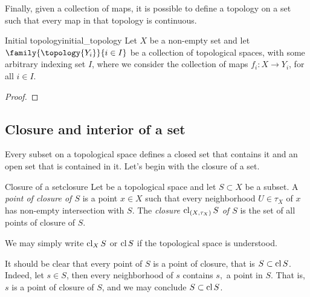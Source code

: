 Finally, given a collection of maps, it is possible to define a topology on a set such that every map in that topology is continuous.
\begin{proposition}{Initial topology}{initial_topology}
    Let \(X\) be a non-empty set and let \(\family{\topology{Y_i}}{i\in I}\) be a collection of topological spaces, with some arbitrary indexing set \(I\), where we consider the collection of maps \(f_i : X \to Y_i\), for all \(i \in I\). 
\end{proposition}
\begin{proof}
\end{proof}

\subsection{Closure and interior of a set}
Every subset on a topological space defines a closed set that contains it and an open set that is contained in it. Let's begin with the closure of a set.
\begin{definition}{Closure of a set}{closure}
    Let  be a topological space and let \(S \subset X\) be a subset. A \emph{point of closure of \(S\)} is a point \(x \in X\) such that every neighborhood \(U\in\tau_X\) of \(x\) has non-empty intersection with \(S\). The \emph{closure \(\operatorname{cl}_{(X, \tau_X)}{S}\) of \(S\)} is the set of all points of closure of \(S\).
\end{definition}
\begin{remark}
    We may simply write \(\operatorname{cl}_X S\) or \(\operatorname{cl} S\) if the topological space is understood.
\end{remark}
\begin{remark}
    It should be clear that every point of \(S\) is a point of closure, that is \(S \subset \operatorname{cl}{S}\). Indeed, let \(s \in S\), then every neighborhood of \(s\) contains \(s,\) a point in \(S\). That is, \(s\) is a point of closure of \(S\), and we may conclude \(S \subset \operatorname{cl} S\).
\end{remark}


